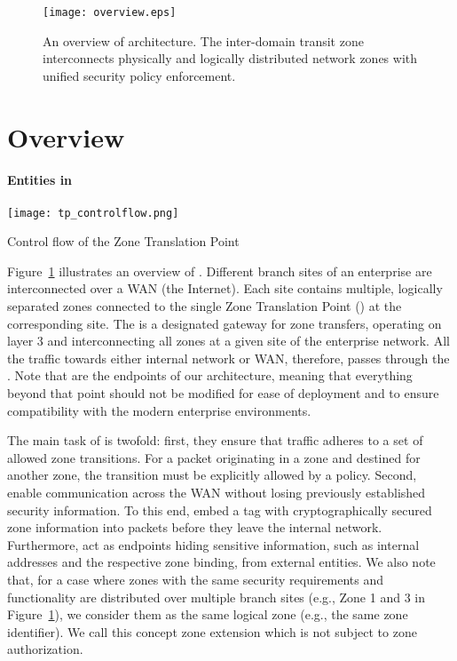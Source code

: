 \begin{figure}[t]
	\begin{center}
		\texttt{[image: overview.eps]}
	\end{center}
	\caption{An overview of \name architecture. The inter-domain transit zone interconnects physically
	and logically distributed network zones with unified security policy enforcement.}
	\label{fig:overview}
\end{figure}

\section{\name Overview}
\label{sec:overview}

\paragraph{Entities in \name}

\begin{floatingfigure}[r]{0.5\textwidth}
	\centering
	\texttt{[image: tp\_controlflow.png]}
	\caption{Control flow of the Zone Translation Point}
	\label{archi:overview}
\end{floatingfigure}

Figure~\ref{fig:overview} illustrates an overview of \name.
Different branch sites of an enterprise are interconnected over a WAN (\eg the Internet). Each site
contains multiple, logically separated zones connected to the single Zone
Translation Point (\tp) at the corresponding site. The \tp is a designated gateway
for zone transfers, operating on layer 3 and interconnecting all zones at a given
site of the enterprise network. All the traffic towards either internal network or
WAN, therefore, passes through the \tp. Note that \tps are the endpoints
of our architecture, meaning that everything beyond that point should not be
modified for ease of deployment and to ensure compatibility with the modern enterprise
environments.

The main task of \tps is twofold:
first, they ensure that traffic adheres to a set of allowed zone transitions. For
a packet originating in a zone and destined for another zone, the transition must be
explicitly allowed by a policy. Second, \tps enable communication across the WAN without
losing previously established security information. To this end, \tps embed a tag
with cryptographically secured zone information into packets before they leave the
internal network. Furthermore, \tps act as endpoints hiding sensitive information,
such as internal addresses and the respective zone binding, from external entities.
We also note that, for a case where zones with the same security requirements and
functionality are distributed over multiple branch sites (e.g., Zone 1 and 3 in
Figure~\ref{fig:overview}),
we consider them as the same logical zone (e.g., the same zone identifier). We call
this concept zone extension which is not subject to zone authorization.

